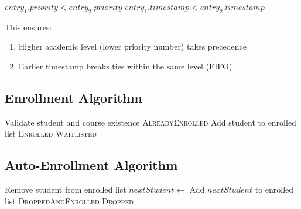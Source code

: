 \documentclass[12pt,a4paper]{article}
\begin{document}
\begin{algorithm}[H]
\caption{Priority Comparison Function}
\begin{algorithmic}[1]
        \State \Return $entry_1.priority < entry_2.priority$
    \Else
        \State \Return $entry_1.timestamp < entry_2.timestamp$
    \EndIf
\EndFunction
\end{algorithmic}
\end{algorithm}

This ensures:
\begin{enumerate}
    \item Higher academic level (lower priority number) takes precedence
    \item Earlier timestamp breaks ties within the same level (FIFO)
\end{enumerate}

\subsection{Enrollment Algorithm}

\begin{algorithm}[H]
\caption{Student Enrollment Process}
\begin{algorithmic}[1]
    \State Validate student and course existence
        \State \Return \textsc{AlreadyEnrolled}
    \EndIf
        \State Add student to enrolled list
        \State \Return \textsc{Enrolled}
    \Else
        \State {}
        \State \Return \textsc{Waitlisted}
    \EndIf
\EndFunction
\end{algorithmic}
\end{algorithm}

\subsection{Auto-Enrollment Algorithm}

\begin{algorithm}[H]
\caption{Course Drop with Auto-Enrollment}
\begin{algorithmic}[1]
    \State Remove student from enrolled list
        \State $nextStudent \gets$ 
        \State Add $nextStudent$ to enrolled list
        \State \Return \textsc{DroppedAndEnrolled}
    \Else
        \State \Return \textsc{Dropped}
    \EndIf
\EndFunction
\end{algorithmic}
\end{algorithm}
\end{document}
